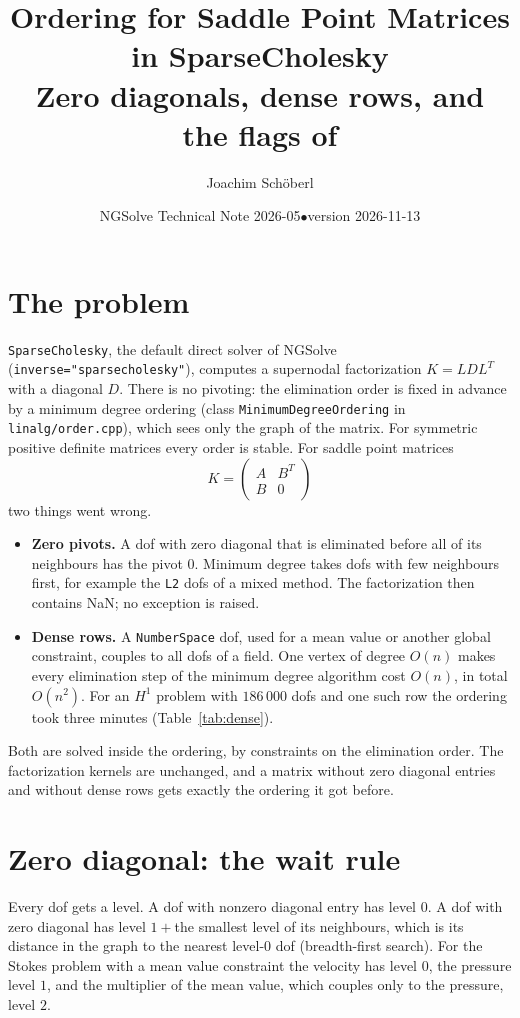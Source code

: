 \documentclass[10pt,a4paper]{article}
\title{\vspace{-1.2cm}Ordering for Saddle Point Matrices in SparseCholesky\\[2pt]
\large Zero diagonals, dense rows, and the flags of \code{Inverse}}
\author{Joachim Sch\"oberl}
\date{NGSolve Technical Note 2026-05\quad$\bullet$\quad version 2026-11-13}
\newcommand{\code}[1]{\texttt{#1}}
\begin{document}
\maketitle\vspace{-1.2cm}

\section{The problem}

\code{SparseCholesky}, the default direct solver of NGSolve (\code{inverse="sparsecholesky"}), computes a supernodal factorization $K = LDL^T$ with a diagonal $D$. There is no pivoting: the elimination order is fixed in advance by a minimum degree ordering \cite{gl89} (class \code{MinimumDegreeOrdering} in \code{linalg/order.cpp}), which sees only the graph of the matrix. For symmetric positive definite matrices every order is stable. For saddle point matrices \cite{bgl05}
\[
K = \begin{pmatrix} A & B^T \\ B & 0 \end{pmatrix}
\]
two things went wrong.
\begin{itemize}\setlength\itemsep{1pt}
\item \textbf{Zero pivots.} A dof with zero diagonal that is eliminated before all of its neighbours has the pivot $0$. Minimum degree takes dofs with few neighbours first, for example the \code{L2} dofs of a mixed method. The factorization then contains NaN; no exception is raised.
\item \textbf{Dense rows.} A \code{NumberSpace} dof, used for a mean value or another global constraint, couples to all dofs of a field. One vertex of degree $O(n)$ makes every elimination step of the minimum degree algorithm cost $O(n)$, in total $O(n^2)$. For an $H^1$ problem with $186\,000$ dofs and one such row the ordering took three minutes (Table~\ref{tab:dense}).
\end{itemize}
Both are solved inside the ordering, by constraints on the elimination order. The factorization kernels are unchanged, and a matrix without zero diagonal entries and without dense rows gets exactly the ordering it got before.

\section{Zero diagonal: the wait rule}

Every dof gets a level. A dof with nonzero diagonal entry has level $0$. A dof with zero diagonal has level $1 + {}$the smallest level of its neighbours, which is its distance in the graph to the nearest level-$0$ dof (breadth-first search). For the Stokes problem with a mean value constraint the velocity has level $0$, the pressure level $1$, and the multiplier of the mean value, which couples only to the pressure, level $2$.
\end{document}
